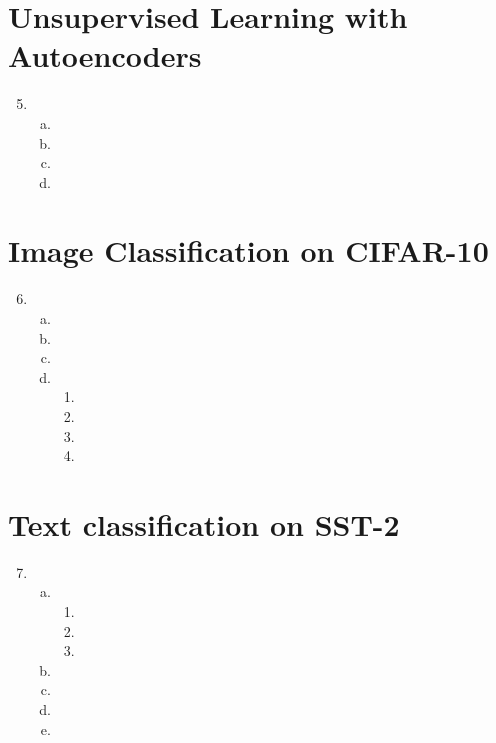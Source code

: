 \documentclass{article}
\newcommand{\1}[1]{\mathbf{1}\left\{#1\right\}}
\begin{document}
\section*{Unsupervised Learning with Autoencoders}
\begin{enumerate}[1.]
\setcounter{enumi}{4}
\item \begin{enumerate}[a.]
      \item
      \item
      \item
      \item
      \end{enumerate}
\end{enumerate}

\section*{Image Classification on CIFAR-10}
\begin{enumerate}[1.]
\setcounter{enumi}{5}
\item \begin{enumerate}[a.]
      \item
      \item
      \item
      \item \begin{enumerate}[1.]
            \item
            \item
            \item
            \item
            \end{enumerate}
      \end{enumerate}
\end{enumerate}

\section*{Text classification on SST-2}
\begin{enumerate}[1.]
\setcounter{enumi}{6}
\item \begin{enumerate}[a.]
      \item \begin{enumerate}[1.]
            \item
            \item
            \item
            \end{enumerate}
      \item
      \item
      \item
      \item
      \end{enumerate}
\end{enumerate}
\end{document}
